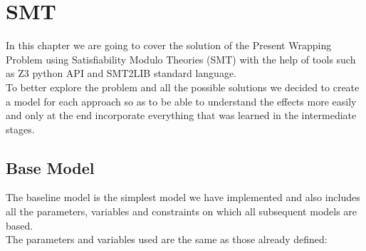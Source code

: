 \chapter{SMT}

In this chapter we are going to cover the solution of the Present Wrapping Problem using Satisfiability Modulo Theories (SMT) with the help of tools such as Z3 python API \cite{z3} and SMT2LIB \cite{smt2lib} standard language.
\\
To better explore the problem and all the possible solutions we decided to create a model for each approach so as to be able to understand the effects more easily and only at the end incorporate everything that was learned in the intermediate stages.

\section{Base Model}

The baseline model is the simplest model we have implemented and also includes all the parameters, variables and constraints on which all subsequent models are based.
\\
The parameters and variables used are the same as those already defined:

